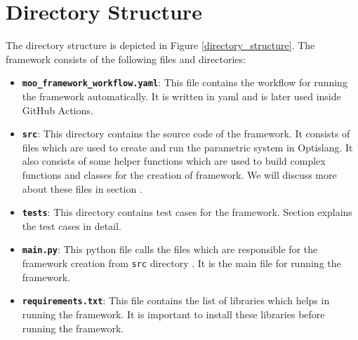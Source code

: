 \section{Directory Structure} \label{directory_structure_section}
The directory structure is depicted in Figure \ref{directory_structure}. The framework consists of the following files and directories:
\begin{itemize}
    \item \textbf{\texttt{moo\_framework\_workflow.yaml}}:\newline
    This file contains the workflow for running the framework automatically. It is written in \acrshort{yaml} and is later used inside GitHub Actions.
    \item \textbf{\texttt{src}}:\newline
    This directory contains the source code of the framework. It consists of files which are used to create and run the parametric system in Optislang. It also
    consists of some helper functions which are used to build complex functions and classes for the creation of framework. We will discuss more about these files
    in section %
    .
    \item \textbf{\texttt{tests}}:\newline
    This directory contains test cases for the framework. Section %
    explains the test cases in detail.
    \item \textbf{\texttt{main.py}}:\newline
    This python file calls the files which are responsible for the framework creation from  \texttt{src} directory . It is the main file for running the framework.
    \item \textbf{\texttt{requirements.txt}}:\newline
    This file contains the list of libraries which helps in running the framework. It is important to install these libraries before running the framework.
\end{itemize}
\newpage
